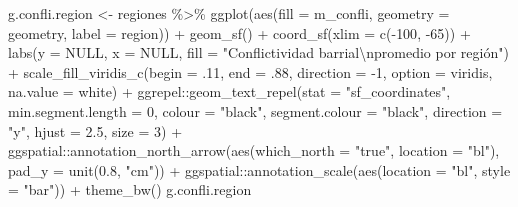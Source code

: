 \documentclass[
  12pt,
]{book}
\newenvironment{Shaded}{\begin{snugshade}}{\end{snugshade}}
\newcommand{\AttributeTok}[1]{\textcolor[rgb]{0.77,0.63,0.00}{#1}}
\newcommand{\ConstantTok}[1]{\textcolor[rgb]{0.00,0.00,0.00}{#1}}
\newcommand{\DecValTok}[1]{\textcolor[rgb]{0.00,0.00,0.81}{#1}}
\newcommand{\FloatTok}[1]{\textcolor[rgb]{0.00,0.00,0.81}{#1}}
\newcommand{\FunctionTok}[1]{\textcolor[rgb]{0.00,0.00,0.00}{#1}}
\newcommand{\NormalTok}[1]{#1}
\newcommand{\OtherTok}[1]{\textcolor[rgb]{0.56,0.35,0.01}{#1}}
\newcommand{\SpecialCharTok}[1]{\textcolor[rgb]{0.00,0.00,0.00}{#1}}
\newcommand{\StringTok}[1]{\textcolor[rgb]{0.31,0.60,0.02}{#1}}
\begin{document}
\begin{Shaded}
\begin{Highlighting}[]
\NormalTok{g.confli.region }\OtherTok{\textless{}{-}}\NormalTok{ regiones }\SpecialCharTok{\%\textgreater{}\%} 
  \FunctionTok{ggplot}\NormalTok{(}\FunctionTok{aes}\NormalTok{(}\AttributeTok{fill =}\NormalTok{ m\_confli, }\AttributeTok{geometry =}\NormalTok{ geometry, }\AttributeTok{label =}\NormalTok{ region)) }\SpecialCharTok{+} 
  \FunctionTok{geom\_sf}\NormalTok{() }\SpecialCharTok{+}
  \FunctionTok{coord\_sf}\NormalTok{(}\AttributeTok{xlim =} \FunctionTok{c}\NormalTok{(}\SpecialCharTok{{-}}\DecValTok{100}\NormalTok{, }\SpecialCharTok{{-}}\DecValTok{65}\NormalTok{)) }\SpecialCharTok{+}
  \FunctionTok{labs}\NormalTok{(}\AttributeTok{y =} \ConstantTok{NULL}\NormalTok{, }\AttributeTok{x =} \ConstantTok{NULL}\NormalTok{, }\AttributeTok{fill =} \StringTok{"Conflictividad barrial}\SpecialCharTok{\textbackslash{}n}\StringTok{promedio por región"}\NormalTok{) }\SpecialCharTok{+}
  \FunctionTok{scale\_fill\_viridis\_c}\NormalTok{(}\AttributeTok{begin =}\NormalTok{ .}\DecValTok{11}\NormalTok{, }\AttributeTok{end =}\NormalTok{ .}\DecValTok{88}\NormalTok{, }\AttributeTok{direction =} \SpecialCharTok{{-}}\DecValTok{1}\NormalTok{, }\AttributeTok{option =} \StringTok{\textquotesingle{}viridis\textquotesingle{}}\NormalTok{, }\AttributeTok{na.value =} \StringTok{\textquotesingle{}white\textquotesingle{}}\NormalTok{) }\SpecialCharTok{+}
\NormalTok{  ggrepel}\SpecialCharTok{::}\FunctionTok{geom\_text\_repel}\NormalTok{(}\AttributeTok{stat =} \StringTok{"sf\_coordinates"}\NormalTok{, }\AttributeTok{min.segment.length =} \DecValTok{0}\NormalTok{,}
                           \AttributeTok{colour =} \StringTok{"black"}\NormalTok{, }\AttributeTok{segment.colour =} \StringTok{"black"}\NormalTok{,}
                           \AttributeTok{direction =} \StringTok{"y"}\NormalTok{, }\AttributeTok{hjust =} \FloatTok{2.5}\NormalTok{, }\AttributeTok{size =} \DecValTok{3}\NormalTok{) }\SpecialCharTok{+}
\NormalTok{  ggspatial}\SpecialCharTok{::}\FunctionTok{annotation\_north\_arrow}\NormalTok{(}\FunctionTok{aes}\NormalTok{(}\AttributeTok{which\_north =} \StringTok{"true"}\NormalTok{, }\AttributeTok{location =} \StringTok{"bl"}\NormalTok{), }\AttributeTok{pad\_y =} \FunctionTok{unit}\NormalTok{(}\FloatTok{0.8}\NormalTok{, }\StringTok{"cm"}\NormalTok{)) }\SpecialCharTok{+}
\NormalTok{  ggspatial}\SpecialCharTok{::}\FunctionTok{annotation\_scale}\NormalTok{(}\FunctionTok{aes}\NormalTok{(}\AttributeTok{location =} \StringTok{"bl"}\NormalTok{, }\AttributeTok{style =} \StringTok{"bar"}\NormalTok{)) }\SpecialCharTok{+}
  \FunctionTok{theme\_bw}\NormalTok{()}
\NormalTok{g.confli.region}
\end{Highlighting}
\end{Shaded}
\end{document}

